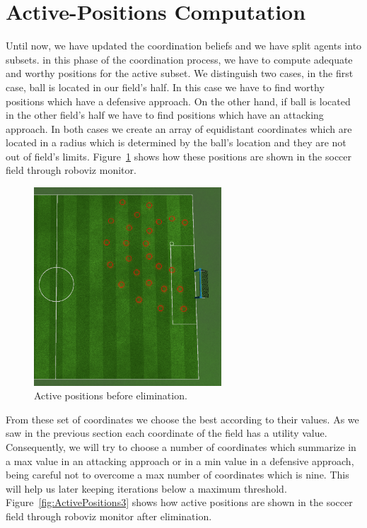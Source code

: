 \section{Active-Positions Computation}
Until now, we have updated the coordination beliefs and we have split agents into subsets. in this phase of the coordination process, we have to compute adequate and worthy positions for the active subset. We distinguish two cases, in the first case, ball is located in our field's half. In this case we have to find worthy positions which have a defensive approach. On the other hand, if ball is located in the other field's half we have to find positions which have an attacking approach. In both cases we create an array of equidistant coordinates which are located in a radius which is determined by the ball's location and they are not out of field's limits. Figure~\ref{fig:ActivePositions2} shows how these positions are shown in the soccer field through roboviz monitor. 


\begin{figure}[t!]
\centering
  \includegraphics[width=7cm]{Chapter4/figures/ActivePositions2.png}
  \caption{Active positions before elimination.} 
  \label{fig:ActivePositions2}
\end{figure}

From these set of coordinates we choose the best according to their values. As we saw in the previous section each coordinate of the field has a utility value. Consequently, we will try to choose a number of coordinates which summarize in a max value in an attacking approach or in a min value in a defensive approach, being careful not to overcome a max number of coordinates which is nine. This will help us later keeping iterations below a maximum threshold. Figure~\ref{fig:ActivePositions3} shows how active positions are shown in the soccer field through roboviz monitor after elimination. 


